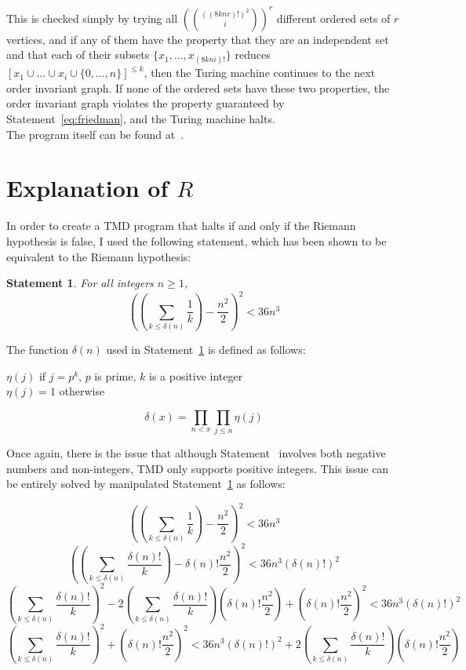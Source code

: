 \documentclass[11pt]{report}
\newtheorem{statement}{Statement}
\newenvironment{nscenter}
 {\parskip=0pt\par\nopagebreak\centering}
 {\par\noindent\ignorespacesafterend}
\begin{document}
This is checked simply by trying all $({((8knr)!)^2 \choose i})^r$ different ordered sets of $r$ vertices, and if any of them have the property that they are an independent set and that each of their subsets $\{x_1, \dots, x_{(8kni)!}\}$ reduces $[x_1 \cup \dots \cup x_i \cup \{0,\dots,n\}]^{\le k}$, then the Turing machine continues to the next order invariant graph. If none of the ordered sets have these two properties, the order invariant graph violates the property guaranteed by Statement~\ref{eq:friedman}, and the Turing machine halts. \\

The program itself can be found at~\cite{github}.

\section{Explanation of $R$}

In order to create a TMD program that halts if and only if the Riemann hypothesis is false, I used the following statement, which has been shown to be equivalent to the Riemann hypothesis:~\cite{riemann}\\

\begin{statement} \label{eq:riemann}
For all integers $n \ge 1$, 
$$\left(\left(\sum_{k \le \delta(n)} \frac{1}{k}\right) - \frac{n^2}{2}\right)^2 < 36n^3$$
\end{statement}

The function $\delta(n)$ used in Statement~\ref{eq:riemann} is defined as follows: \\

\begin{nscenter}
$\eta(j)$ if $j = p^k$, $p$ is prime, $k$ is a positive integer \\
$\eta(j) = 1$ otherwise
\end{nscenter}
$$\delta(x) = \prod_{n<x}\prod_{j \le n} \eta(j)$$

Once again, there is the issue that although Statement~\label{eq:riemann} involves both negative numbers and non-integers, TMD only supports positive integers. This issue can be entirely solved by manipulated Statement~\ref{eq:riemann} as follows:

$$\left(\left(\sum_{k \le \delta(n)} \frac{1}{k}\right) - \frac{n^2}{2}\right)^2 < 36n^3$$
$$\left(\left(\sum_{k \le \delta(n)} \frac{\delta(n)!}{k}\right) - \delta(n)!\frac{n^2}{2}\right)^2 < 36n^3(\delta(n)!)^2$$
$$\left(\sum_{k \le \delta(n)} \frac{\delta(n)!}{k}\right)^2 - 2\left(\sum_{k \le \delta(n)} \frac{\delta(n)!}{k}\right) \left(\delta(n)!\frac{n^2}{2}\right) + \left(\delta(n)!\frac{n^2}{2}\right)^2 < 36n^3(\delta(n)!)^2$$
$$\left(\sum_{k \le \delta(n)} \frac{\delta(n)!}{k}\right)^2 + \left(\delta(n)!\frac{n^2}{2}\right)^2 < 36n^3(\delta(n)!)^2 + 2\left(\sum_{k \le \delta(n)} \frac{\delta(n)!}{k}\right) \left(\delta(n)!\frac{n^2}{2}\right)$$
\end{document}
